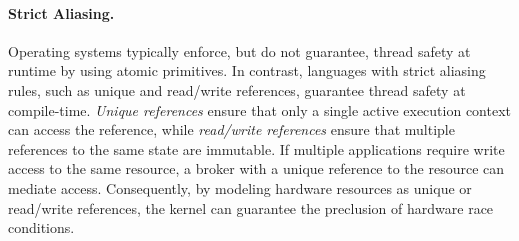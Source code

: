 \paragraph{Strict Aliasing.}
Operating systems typically enforce, but do not guarantee, thread safety at
runtime by using atomic primitives. In contrast, languages with strict aliasing
rules, such as unique and read/write references, guarantee thread safety at
compile-time. \textit{Unique references} ensure that only a single active
execution context can access the reference, while \textit{read/write references}
ensure that multiple references to the same state are immutable. If multiple
applications require write access to the same resource, a broker with a unique
reference to the resource can mediate access. Consequently, by modeling hardware
resources as unique or read/write references, the kernel can guarantee the
preclusion of hardware race conditions.
